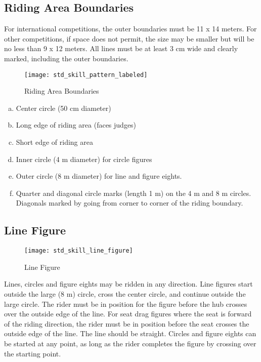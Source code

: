 \subsection{Riding Area Boundaries \label{subsec:freestyle_floor-markings-figure-shapes_riding-area-boundaries}}
For international competitions, the outer boundaries must be 11 x 14 meters.
For other competitions, if space does not permit, the size may be smaller but will be no less than 9 x 12 meters.
All lines must be at least 3 cm wide and clearly marked, including the outer boundaries.

\begin{figure}[h]
\begin{center}
\texttt{[image: std\_skill\_pattern\_labeled]}
\end{center}
\vspace{-20pt}
\caption{Riding Area Boundaries \label{fig:std_skill_pattern_labeled}}
\vspace{-10pt}
\end{figure}

\begin{enumerate}[a.]
\item Center circle (50 cm diameter)
\item Long edge of riding area (faces judges)
\item Short edge of riding area
\item Inner circle (4 m diameter) for circle figures
\item Outer circle (8 m diameter) for line and figure eights.
\item Quarter and diagonal circle marks (length 1 m) on the 4 m and 8 m circles.
Diagonals marked by going from corner to corner of the riding boundary.
\end{enumerate}


\subsection{Line Figure}
\begin{wrapfigure}{r}{0.35\textwidth}
\vspace{-35pt}
\begin{center}
\texttt{[image: std\_skill\_line\_figure]}
\end{center}
\vspace{-20pt}
\caption{Line Figure\label{fig:std_skill_line_figure}}
\vspace{-10pt}
\end{wrapfigure}
Lines, circles and figure eights may be ridden in any direction.
Line figures start outside the large (8 m) circle, cross the center circle, and continue outside the large circle.
The rider must be in position for the figure before the hub crosses over the outside edge of the line.
For seat drag figures where the seat is forward of the riding direction, the rider must be in position before the seat crosses the outside edge of the line.
The line should be straight.
Circles and figure eights can be started at any point, as long as the rider completes the figure by crossing over the starting point.

